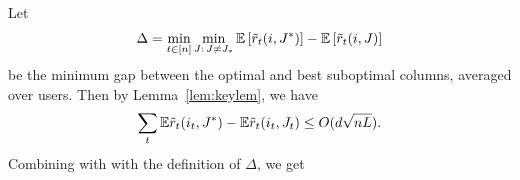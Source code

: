  Let
\begin{align*}
  \Delta =
  \min_{t \in [n]} \min_{J:\, J \neq J_\ast} \mathbb{E}\left[\tilde{r}_t(i, J^\ast)\right] - \mathbb{E}\left[\tilde{r}_t(i, J)\right]
\end{align*}
be the minimum gap between the optimal and best suboptimal columns, averaged over users. Then by Lemma~\ref{lem:keylem}, we have
$$    \sum_t \mathbb{E} \tilde{r}_t(i_t, J^*) -  \mathbb{E} \tilde{r}_t(i_t, J_t) \leq   O(d\sqrt{nL}).$$ 
Combining with with the definition of $\Delta$, we get
